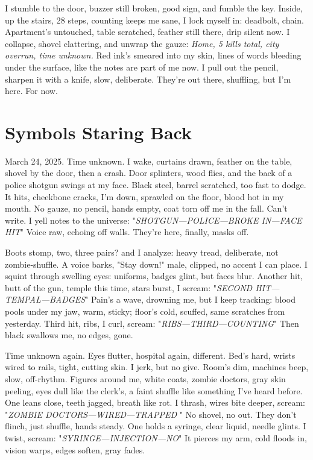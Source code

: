 \documentclass{article}
\begin{document}
I stumble to the door, buzzer still broken, good sign, and fumble the key. Inside, up the stairs, 28 steps, counting keeps me sane, I lock myself in: deadbolt, chain. Apartment's untouched, table scratched, feather still there, drip silent now. I collapse, shovel clattering, and unwrap the gauze: \textit{Home, 5 kills total, city overrun, time unknown.} Red ink's smeared into my skin, lines of words bleeding under the surface, like the notes are part of me now. I pull out the pencil, sharpen it with a knife, slow, deliberate. They're out there, shuffling, but I'm here. For now.

\section{Symbols Staring Back}

March 24, 2025. Time unknown. I wake, curtains drawn, feather on the table, shovel by the door, then a crash. Door splinters, wood flies, and the back of a police shotgun swings at my face. Black steel, barrel scratched, too fast to dodge. It hits, cheekbone cracks, I'm down, sprawled on the floor, blood hot in my mouth. No gauze, no pencil, hands empty, coat torn off me in the fall. Can't write. I yell notes to the universe: "\textit{SHOTGUN—POLICE—BROKE IN—FACE HIT}" Voice raw, echoing off walls. They're here, finally, masks off.

Boots stomp, two, three pairs? and I analyze: heavy tread, deliberate, not zombie-shuffle. A voice barks, "Stay down!" male, clipped, no accent I can place. I squint through swelling eyes: uniforms, badges glint, but faces blur. Another hit, butt of the gun, temple this time, stars burst, I scream: "\textit{SECOND HIT—TEMPAL—BADGES}" Pain's a wave, drowning me, but I keep tracking: blood pools under my jaw, warm, sticky; floor's cold, scuffed, same scratches from yesterday. Third hit, ribs, I curl, scream: "\textit{RIBS—THIRD—COUNTING}" Then black swallows me, no edges, gone.

Time unknown again. Eyes flutter, hospital again, different. Bed's hard, wrists wired to rails, tight, cutting skin. I jerk, but no give. Room's dim, machines beep, slow, off-rhythm. Figures around me, white coats, zombie doctors, gray skin peeling, eyes dull like the clerk's, a faint shuffle like something I've heard before. One leans close, teeth jagged, breath like rot. I thrash, wires bite deeper, scream: "\textit{ZOMBIE DOCTORS—WIRED—TRAPPED }" No shovel, no out. They don't flinch, just shuffle, hands steady. One holds a syringe, clear liquid, needle glints. I twist, scream: "\textit{SYRINGE—INJECTION—NO}" It pierces my arm, cold floods in, vision warps, edges soften, gray fades.
\end{document}
